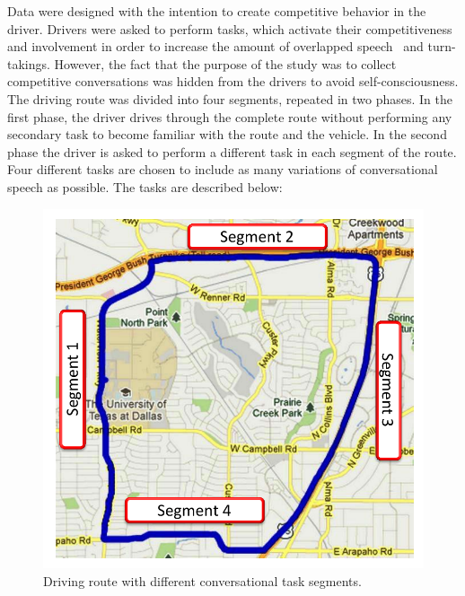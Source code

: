 Data were designed with the intention to create competitive behavior in the driver. 
Drivers were asked to perform tasks, which activate their competitiveness and involvement in order to increase the amount of overlapped speech~\cite{Schegloff} and turn-takings. 
However, the fact that the purpose of the study was to collect competitive conversations was hidden from the drivers to avoid self-consciousness. 
The driving route was divided into four segments, repeated in two phases. 
In the first phase, the driver drives through the complete route without performing any secondary task to become familiar with the route and the vehicle. 
In the second phase the driver is asked to perform a different task in each segment of the route. 
Four different tasks are chosen to include as many variations of conversational speech as possible. 
The tasks are described below:

\begin{figure}[h!]
	\centering
	\includegraphics[width=0.6\linewidth]{figures/route_map-crop}
	\caption {Driving route with different conversational task segments.}
	\label{fig:map}
\end{figure}


